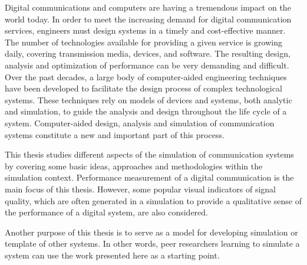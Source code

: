 \begin{enabstract}
\noindent Digital communications and computers are having a tremendous impact on the world today. In order to meet the increasing demand for digital communication services, engineers must design systems in a timely and cost-effective manner. The number of technologies available for providing a given service is growing daily, covering transmission media, devices, and software. The resulting design, analysis and optimization of performance can be very demanding and difficult. Over the past decades, a large body of computer-aided engineering techniques have been developed to facilitate the design process of complex technological systems. These techniques rely on models of devices and systems, both analytic and simulation, to guide the analysis and design throughout the life cycle of a system. Computer-aided design, analysis and simulation of communication systems constitute a new and important part of this process.
\par
This thesis studies different aspects of the simulation of communication systems by covering some basic ideas, approaches and methodologies within the simulation context. Performance measurement of a digital communication is the main focus of this thesis. However, some popular visual indicators of signal quality, which are often generated in a simulation to provide a qualitative sense of the performance of a digital system, are also considered.
\par
Another purpose of this thesis is to serve as a model for developing simulation or template of other systems. In other words, peer researchers learning to simulate a system can use the work presented here as a starting point.
\par
{}
\end{enabstract} 